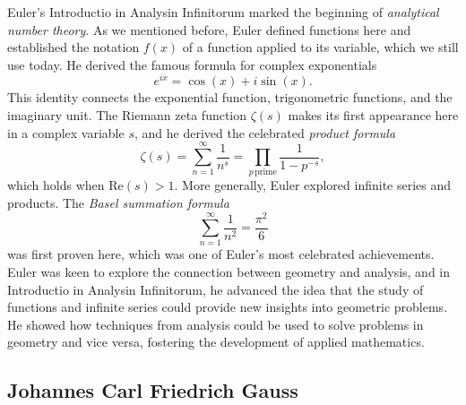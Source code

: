 Euler's Introductio in Analysin Infinitorum marked the beginning of \emph{analytical number theory}. As we mentioned before, Euler defined functions here and established the notation $f(x)$ of a function applied to its variable, which we still use today. He derived the famous formula for complex exponentials
\begin{equation*}
  e^{ix}=\cos(x) + i \sin(x).
\end{equation*}
This identity connects the exponential function, trigonometric functions, and the imaginary unit. The Riemann zeta function $\zeta(s)$ makes its first appearance here in a complex variable $s$, and he derived the celebrated \emph{product formula}
\begin{equation*}
  \zeta(s)=\sum_{n=1}^{\infty}\frac{1}{n^s}=\prod_{p\,\mathrm{prime}}\frac{1}{1-p^{-s}},
\end{equation*}
which holds when $\mathrm{Re}(s)>1$. More generally, Euler explored infinite series and products. The \emph{Basel summation formula}
\begin{equation*}
  \sum_{n=1}^\infty \frac{1}{n^2}=\frac{\pi^2}{6}
\end{equation*}
was first proven here, which was one of Euler's most celebrated achievements. Euler was keen to explore the connection between geometry and analysis, and in Introductio in Analysin Infinitorum, he advanced the idea that the study of functions and infinite series could provide new insights into geometric problems. He showed how techniques from analysis could be used to solve problems in geometry and vice versa, fostering the development of applied mathematics.

\subsection{Johannes Carl Friedrich Gauss}


